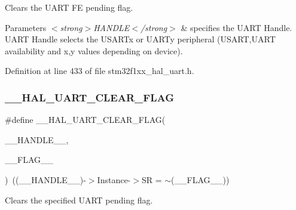 Clears the U\+A\+RT FE pending flag. 


\begin{DoxyParams}{Parameters}
{\em $<$strong$>$\+H\+A\+N\+D\+L\+E$<$/strong$>$} & specifies the U\+A\+RT Handle. U\+A\+RT Handle selects the U\+S\+A\+R\+Tx or U\+A\+R\+Ty peripheral (U\+S\+A\+RT,U\+A\+RT availability and x,y values depending on device). \\
\hline
\end{DoxyParams}


Definition at line 433 of file stm32f1xx\+\_\+hal\+\_\+uart.\+h.

\mbox{\label{group___u_a_r_t___exported___macros_ga9bd035161d41cde4f2568c7af06493bf}} 
\subsubsection{\texorpdfstring{\+\_\+\+\_\+\+H\+A\+L\+\_\+\+U\+A\+R\+T\+\_\+\+C\+L\+E\+A\+R\+\_\+\+F\+L\+AG}{\_\_HAL\_UART\_CLEAR\_FLAG}}
{\footnotesize\ttfamily \#define \+\_\+\+\_\+\+H\+A\+L\+\_\+\+U\+A\+R\+T\+\_\+\+C\+L\+E\+A\+R\+\_\+\+F\+L\+AG(\begin{DoxyParamCaption}\item[{}]{\+\_\+\+\_\+\+H\+A\+N\+D\+L\+E\+\_\+\+\_\+,  }\item[{}]{\+\_\+\+\_\+\+F\+L\+A\+G\+\_\+\+\_\+ }\end{DoxyParamCaption})~((\+\_\+\+\_\+\+H\+A\+N\+D\+L\+E\+\_\+\+\_\+)-\/$>$Instance-\/$>$SR = $\sim$(\+\_\+\+\_\+\+F\+L\+A\+G\+\_\+\+\_\+))}



Clears the specified U\+A\+RT pending flag. 


